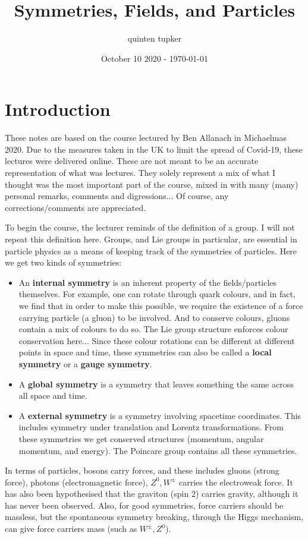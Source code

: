 \documentclass{article}
\title{Symmetries, Fields, and Particles}
\author{quinten tupker}
\date{October 10 2020 - \today}
\theoremstyle{definition}
\begin{document}
\maketitle

\section*{Introduction}

These notes are based on the course lectured by Ben Allanach in Michaelmas 2020.
Due to the measures taken in the UK to limit the spread of
Covid-19, these lectures were delivered online. These are not meant to be an
accurate representation of what was lectures. They solely represent a mix of
what I thought was the most important part of the course, mixed in with many
(many) personal remarks, comments and digressions... Of course, any
corrections/comments are appreciated.

To begin the course, the lecturer reminds of the definition of a group. I will
not repeat this definition here. Groups, and Lie groups in particular, are
essential in particle physics as a means of keeping track of the symmetries of
particles. Here we get two kinds of symmetries:

\begin{itemize}
\item An \textbf{internal symmetry} is an inherent property of the
  fields/particles themselves. For example, one can rotate through quark
  colours, and in fact, we find that in order to make this possible, we require
  the existence of a force carrying particle (a gluon) to be involved. And to
  conserve colours, gluons contain a mix of colours to do so. The Lie group
  structure enforces colour conservation here... Since these colour rotations can be different at
  different points in space and time, these symmetries can also be
  called a \textbf{local symmetry} or a \textbf{gauge symmetry}.
\item A \textbf{global symmetry} is a symmetry that leaves something the same
  across all space and time. 
\item A \textbf{external symmetry} is a symmetry involving spacetime
  coordinates. This includes symmetry under translation and Lorentz
  transformations. From these symmetries we get conserved structures (momentum,
  angular momentum, and energy). The Poincare group contains all these
  symmetries. 
\end{itemize}

In terms of particles, bosons carry forces, and these includes gluons (strong
force), photons (electromagnetic force), $Z^0, W^\pm$ carries the electroweak
force. It has also been hypothesised that the graviton (spin 2) carries gravity,
although it has never been observed. Also, for good symmetries, force carriers
should be massless, but the spontaneous symmetry breaking, through the Higgs
mechanism, can give force carriers mass (such as $W^\pm, Z^0$).
\end{document}
